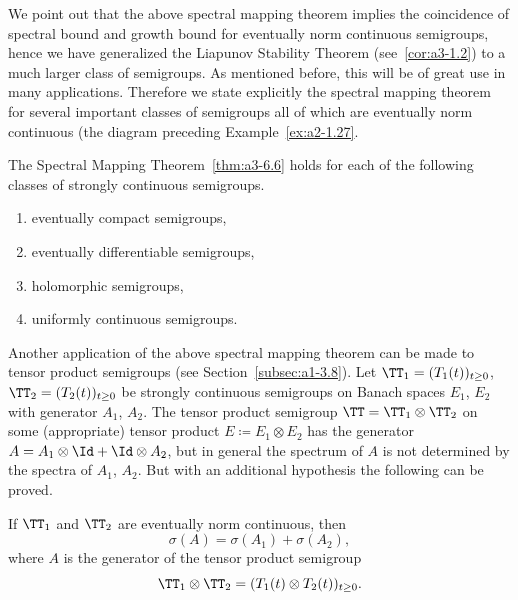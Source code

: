 We point out that the above spectral mapping theorem implies the coincidence of spectral bound and growth bound for eventually norm continuous semigroups, hence we have generalized the Liapunov Stability Theorem (see~\ref{cor:a3-1.2}) to a much larger class of semigroups.
As mentioned before, this will be of great use in many applications.
Therefore we state explicitly the spectral mapping theorem for several important classes of semigroups all of which are eventually norm continuous (\cf the diagram preceding Example~\ref{ex:a2-1.27}.
\begin{corollary}\label{cor:a3-6.7}
The Spectral Mapping Theorem~\ref{thm:a3-6.6}
holds for each of the following classes of strongly continuous semigroups.
\begin{enumerate}[\upshape (i)]
\item 
eventually compact semigroups,

\item 
eventually differentiable semigroups,

\item 
holomorphic semigroups,

\item 
uniformly continuous semigroups.
\end{enumerate}
\end{corollary}
Another application of the above spectral mapping theorem can be made to tensor product semigroups (see Section~\ref{subsec:a1-3.8}).
Let $\TT_{1} = (T_{1}(t))_{t\geq 0}$, $\TT_{2} = (T_{2}(t))_{t\geq 0}$ be strongly continuous semigroups on Banach spaces $E_{1}$, $E_{2}$ with generator $A_{1}$, $A_{2}$.
The tensor product semigroup $\TT = \TT_{1} \otimes \TT_{2}$ on some (appropriate) tensor product $E \coloneqq E_{1} \otimes E_{2}$ has the generator $A = A_{1}\otimes\Id + \Id\otimes A_{2}$, but in general the spectrum of\/ $A$ is not determined by the spectra of\/ $A_{1}$, $A_{2}$.
But with an additional hypothesis the following can be proved.
%
\begin{corollary}\label{cor:a3-6.8}
If\/ $\TT_{1}$ and $\TT_{2}$ are eventually norm continuous, then
\[
	\sigma(A) = \sigma(A_{1}) + \sigma(A_{2}) ,
\]
where $A$ is the generator of the tensor product semigroup
\[
	\TT_{1} \otimes \TT_{2} = (T_{1}(t) \otimes T_{2}(t))_{t\geq 0} .
\]
\end{corollary}
